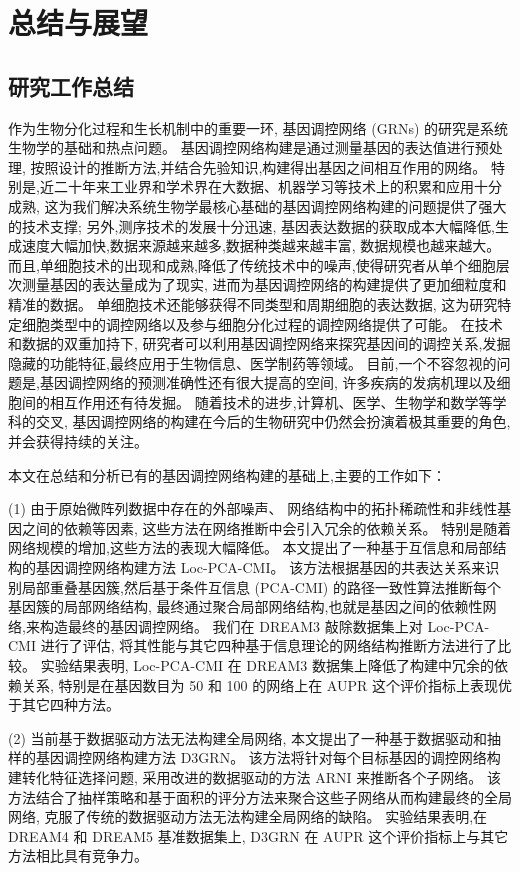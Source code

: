 \section{总结与展望}

\subsection{研究工作总结}

作为生物分化过程和生长机制中的重要一环,
基因调控网络 (GRNs) 的研究是系统生物学的基础和热点问题。
基因调控网络构建是通过测量基因的表达值进行预处理,
按照设计的推断方法,并结合先验知识,构建得出基因之间相互作用的网络。
特别是,近二十年来工业界和学术界在大数据、机器学习等技术上的积累和应用十分成熟,
这为我们解决系统生物学最核心基础的基因调控网络构建的问题提供了强大的技术支撑;
另外,测序技术的发展十分迅速,
基因表达数据的获取成本大幅降低,生成速度大幅加快,数据来源越来越多,数据种类越来越丰富, 数据规模也越来越大。
而且,单细胞技术的出现和成熟,降低了传统技术中的噪声,使得研究者从单个细胞层次测量基因的表达量成为了现实,
进而为基因调控网络的构建提供了更加细粒度和精准的数据。
单细胞技术还能够获得不同类型和周期细胞的表达数据,
这为研究特定细胞类型中的调控网络以及参与细胞分化过程的调控网络提供了可能。
在技术和数据的双重加持下,
研究者可以利用基因调控网络来探究基因间的调控关系,发掘隐藏的功能特征,最终应用于生物信息、医学制药等领域。
目前,一个不容忽视的问题是,基因调控网络的预测准确性还有很大提高的空间,
许多疾病的发病机理以及细胞间的相互作用还有待发掘。
随着技术的进步,计算机、医学、生物学和数学等学科的交叉,
基因调控网络的构建在今后的生物研究中仍然会扮演着极其重要的角色,并会获得持续的关注。

本文在总结和分析已有的基因调控网络构建的基础上,主要的工作如下：

(1) 由于原始微阵列数据中存在的外部噪声、
网络结构中的拓扑稀疏性和非线性基因之间的依赖等因素,
这些方法在网络推断中会引入冗余的依赖关系。
特别是随着网络规模的增加,这些方法的表现大幅降低。
本文提出了一种基于互信息和局部结构的基因调控网络构建方法 Loc-PCA-CMI。
该方法根据基因的共表达关系来识别局部重叠基因簇,然后基于条件互信息 (PCA-CMI) 的路径一致性算法推断每个基因簇的局部网络结构,
最终通过聚合局部网络结构,也就是基因之间的依赖性网络,来构造最终的基因调控网络。
我们在 DREAM3 敲除数据集上对 Loc-PCA-CMI 进行了评估,
将其性能与其它四种基于信息理论的网络结构推断方法进行了比较。
实验结果表明, Loc-PCA-CMI 在 DREAM3 数据集上降低了构建中冗余的依赖关系,
特别是在基因数目为 50 和 100 的网络上在 AUPR 这个评价指标上表现优于其它四种方法。

(2) 当前基于数据驱动方法无法构建全局网络,
本文提出了一种基于数据驱动和抽样的基因调控网络构建方法 D3GRN。
该方法将针对每个目标基因的调控网络构建转化特征选择问题,
采用改进的数据驱动的方法 ARNI 来推断各个子网络。
该方法结合了抽样策略和基于面积的评分方法来聚合这些子网络从而构建最终的全局网络,
克服了传统的数据驱动方法无法构建全局网络的缺陷。
实验结果表明,在 DREAM4 和 DREAM5 基准数据集上,
 D3GRN 在 AUPR 这个评价指标上与其它方法相比具有竞争力。

